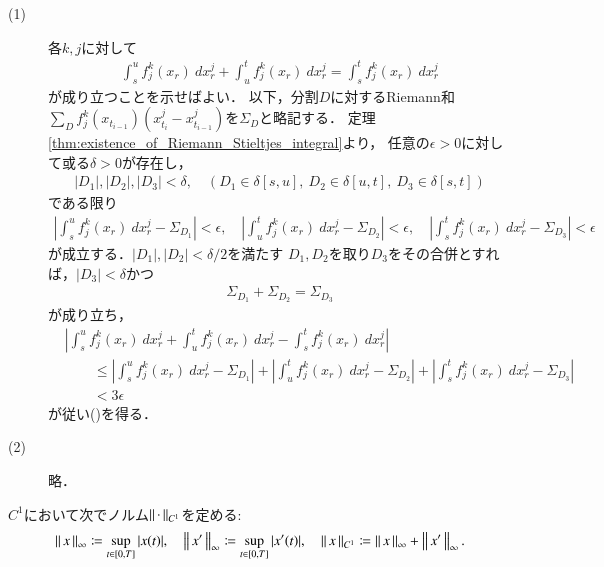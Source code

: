\begin{prf}\mbox{}
	\begin{description}
		\item[(1)] 
			各$k,j$に対して
			\begin{align}
				\int_s^u f^k_j(x_r)\ dx^j_r
				+ \int_u^t f^k_j(x_r)\ dx^j_r
				= \int_s^t f^k_j(x_r)\ dx^j_r
				\label{eq:thm_linearity_of_Riemann_Stieltjes_integral_1}
			\end{align}
			が成り立つことを示せばよい．
			以下，分割$D$に対するRiemann和$\sum_D f^k_j(x_{t_{i-1}})(x^j_{t_i} - x^j_{t_{i-1}})$を$\Sigma_D$と略記する．
			定理\ref{thm:existence_of_Riemann_Stieltjes_integral}より，
			任意の$\epsilon > 0$に対して或る$\delta > 0$が存在し，
			\begin{align}
				|D_1|,|D_2|,|D_3| < \delta,
				\quad \left(D_1 \in \delta[s,u],\ D_2 \in \delta[u,t],\ D_3 \in \delta[s,t] \right)
			\end{align}
			である限り
			\begin{align}
				\left| \int_s^u f^k_j(x_r)\ dx^j_r - \Sigma_{D_1} \right| < \epsilon,
				\quad \left| \int_u^t f^k_j(x_r)\ dx^j_r - \Sigma_{D_2} \right| < \epsilon,
				\quad \left| \int_s^t f^k_j(x_r)\ dx^j_r - \Sigma_{D_3} \right| < \epsilon
			\end{align}
			が成立する．$|D_1|,|D_2| < \delta/2$を満たす
			$D_1,D_2$を取り$D_3$をその合併とすれば，$|D_3| < \delta$かつ
			\begin{align}
				\Sigma_{D_1} + \Sigma_{D_2} = \Sigma_{D_3}
			\end{align}
			が成り立ち，
			\begin{align}
				&\left| \int_s^u f^k_j(x_r)\ dx^j_r + \int_u^t f^k_j(x_r)\ dx^j_r
					- \int_s^t f^k_j(x_r)\ dx^j_r \right| \\
				&\qquad \leq \left| \int_s^u f^k_j(x_r)\ dx^j_r - \Sigma_{D_1} \right|
				+ \left| \int_u^t f^k_j(x_r)\ dx^j_r - \Sigma_{D_2} \right|
				+ \left| \int_s^t f^k_j(x_r)\ dx^j_r - \Sigma_{D_3} \right| \\
				&\qquad < 3\epsilon
			\end{align}
			が従い()を得る．
		
		\item[(2)] 略．
		\QED
	\end{description}
\end{prf}
$C^1$において次でノルム$\left\|\, \cdot\, \right\|_{C^1}$を定める:
\begin{align}
	\left\|\, x\, \right\|_{\infty} \coloneqq \operatorname*{sup}_{t \in [0,T]} |x(t)|,
	\quad \left\|\, x'\, \right\|_{\infty} \coloneqq \operatorname*{sup}_{t \in [0,T]} |x'(t)|,
	\quad \left\|\, x\, \right\|_{C^1} \coloneqq
	\left\|\, x\, \right\|_{\infty} + \left\|\, x'\, \right\|_{\infty}.
\end{align}

